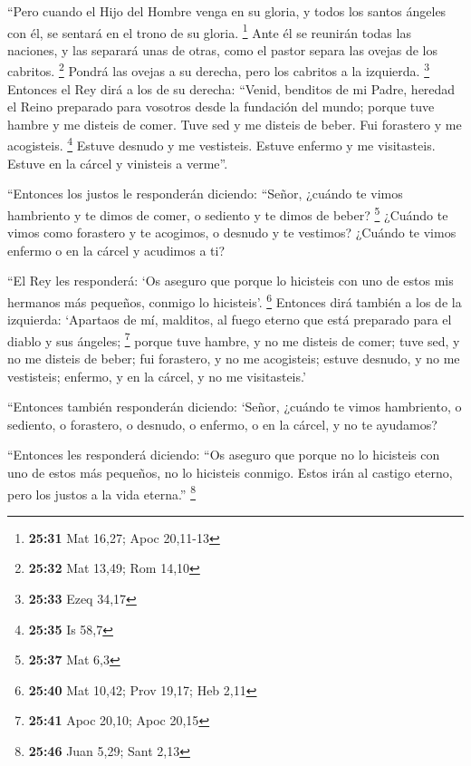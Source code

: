 \begin{paracol}{2}
 ``Pero cuando el Hijo del Hombre venga en su gloria, y
todos los santos ángeles con él, se sentará en el trono de su gloria.
\footnote{\textbf{25:31} Mat 16,27; Apoc 20,11-13}  Ante
él se reunirán todas las naciones, y las separará unas de otras, como el
pastor separa las ovejas de los cabritos. \footnote{\textbf{25:32} Mat
  13,49; Rom 14,10}  Pondrá las ovejas a su derecha, pero
los cabritos a la izquierda. \footnote{\textbf{25:33} Ezeq 34,17}
 Entonces el Rey dirá a los de su derecha: ``Venid,
benditos de mi Padre, heredad el Reino preparado para vosotros desde la
fundación del mundo;  porque tuve hambre y me disteis de
comer. Tuve sed y me disteis de beber. Fui forastero y me acogisteis.
\footnote{\textbf{25:35} Is 58,7}  Estuve desnudo y me
vestisteis. Estuve enfermo y me visitasteis. Estuve en la cárcel y
vinisteis a verme''.

 ``Entonces los justos le responderán diciendo: ``Señor,
¿cuándo te vimos hambriento y te dimos de comer, o sediento y te dimos
de beber? \footnote{\textbf{25:37} Mat 6,3}  ¿Cuándo te
vimos como forastero y te acogimos, o desnudo y te vestimos?
 ¿Cuándo te vimos enfermo o en la cárcel y acudimos a ti?

 ``El Rey les responderá: `Os aseguro que porque lo
hicisteis con uno de estos mis hermanos más pequeños, conmigo lo
hicisteis'. \footnote{\textbf{25:40} Mat 10,42; Prov 19,17; Heb 2,11}
 Entonces dirá también a los de la izquierda: `Apartaos
de mí, malditos, al fuego eterno que está preparado para el diablo y sus
ángeles; \footnote{\textbf{25:41} Apoc 20,10; Apoc 20,15}
 porque tuve hambre, y no me disteis de comer; tuve sed,
y no me disteis de beber;  fui forastero, y no me
acogisteis; estuve desnudo, y no me vestisteis; enfermo, y en la cárcel,
y no me visitasteis.'

 ``Entonces también responderán diciendo: `Señor, ¿cuándo
te vimos hambriento, o sediento, o forastero, o desnudo, o enfermo, o en
la cárcel, y no te ayudamos?

 ``Entonces les responderá diciendo: ``Os aseguro que
porque no lo hicisteis con uno de estos más pequeños, no lo hicisteis
conmigo.  Estos irán al castigo eterno, pero los justos a
la vida eterna.'' \footnote{\textbf{25:46} Juan 5,29; Sant 2,13}

\switchcolumn
\begin{otherlanguage}{english}


\end{otherlanguage}
\end{paracol}
